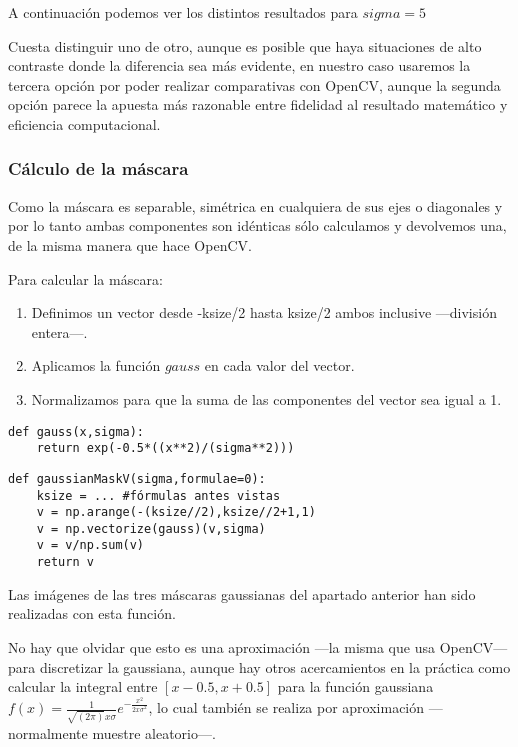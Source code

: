 \documentclass{article}
\newcommand{\img}[2]{
\noindent\makebox[\textwidth][c]{\texttt{[image: \#1]}}%
}
\begin{document}
A continuación podemos ver los distintos resultados para $sigma=5$

\img{eximg/ej10_ksize}{0.8}

\img{eximg/ej10_ksizeimg}{0.8}

Cuesta distinguir uno de otro, aunque es posible que haya situaciones de alto contraste donde la diferencia sea más evidente, en nuestro caso usaremos la tercera opción por poder realizar comparativas con OpenCV, aunque la segunda opción parece la apuesta más razonable entre fidelidad al resultado matemático y eficiencia computacional.

\subsubsection{Cálculo de la máscara}

Como la máscara es separable, simétrica en cualquiera de sus ejes o diagonales y por lo tanto ambas componentes son idénticas sólo calculamos y devolvemos una, de la misma manera que hace OpenCV.

Para calcular la máscara:

\begin{enumerate}
\item Definimos un vector desde -ksize/2 hasta ksize/2 ambos inclusive ---división entera---.
\item Aplicamos la función $gauss$ en cada valor del vector.
\item Normalizamos para que la suma de las componentes del vector sea igual a 1.
\end{enumerate}

\begin{lstlisting}
def gauss(x,sigma):
    return exp(-0.5*((x**2)/(sigma**2)))
\end{lstlisting}

\begin{lstlisting}
def gaussianMaskV(sigma,formulae=0):
    ksize = ... #fórmulas antes vistas
    v = np.arange(-(ksize//2),ksize//2+1,1)
    v = np.vectorize(gauss)(v,sigma)
    v = v/np.sum(v)
    return v
\end{lstlisting}

Las imágenes de las tres máscaras gaussianas del apartado anterior han sido realizadas con esta función.

No hay que olvidar que esto es una aproximación ---la misma que usa OpenCV--- para discretizar la gaussiana, aunque hay otros acercamientos en la práctica como calcular la integral entre $[x-0.5,x+0.5]$ para la función gaussiana $f(x)=\frac{1}{\sqrt{(2\pi)}x\sigma}e^{-\frac{x^2}{2x\sigma^2}}$, lo cual también se realiza por aproximación ---normalmente muestre aleatorio---.
\end{document}

